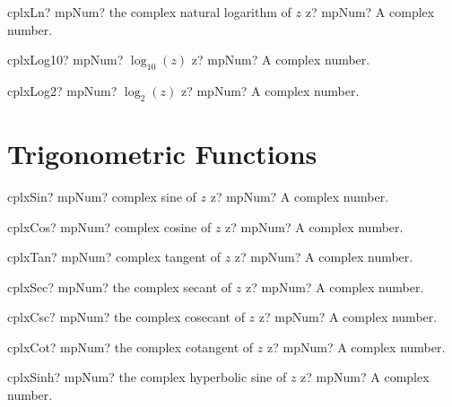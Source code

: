 \documentclass[12pt,a4paper,openany]{book}
\begin{document}
\begin{mpFunctionsExtract}
\mpFunctionOne
{cplxLn? mpNum? the complex natural logarithm of $z$}
{z? mpNum? A complex number.}
\end{mpFunctionsExtract}

\begin{mpFunctionsExtract}
\mpFunctionOne
{cplxLog10? mpNum? $\log_{10}(z)$}
{z? mpNum? A complex number.}
\end{mpFunctionsExtract}

\begin{mpFunctionsExtract}
\mpFunctionOne
{cplxLog2? mpNum? $\log_{2}(z)$}
{z? mpNum? A complex number.}
\end{mpFunctionsExtract}

\section{Trigonometric Functions}

\begin{mpFunctionsExtract}
\mpFunctionOne
{cplxSin? mpNum? complex sine of $z$}
{z? mpNum? A complex number.}
\end{mpFunctionsExtract}

\begin{mpFunctionsExtract}
\mpFunctionOne
{cplxCos? mpNum? complex cosine of $z$}
{z? mpNum? A complex number.}
\end{mpFunctionsExtract}

\begin{mpFunctionsExtract}
\mpFunctionOne
{cplxTan? mpNum? complex tangent of $z$}
{z? mpNum? A complex number.}
\end{mpFunctionsExtract}

\begin{mpFunctionsExtract}
\mpFunctionOne
{cplxSec? mpNum? the complex secant of $z$}
{z? mpNum? A complex number.}
\end{mpFunctionsExtract}

\begin{mpFunctionsExtract}
\mpFunctionOne
{cplxCsc? mpNum? the complex cosecant of $z$}
{z? mpNum? A complex number.}
\end{mpFunctionsExtract}

\begin{mpFunctionsExtract}
\mpFunctionOne
{cplxCot? mpNum? the complex cotangent of $z$}
{z? mpNum? A complex number.}
\end{mpFunctionsExtract}

\begin{mpFunctionsExtract}
\mpFunctionOne
{cplxSinh? mpNum? the complex hyperbolic sine of $z$}
{z? mpNum? A complex number.}
\end{mpFunctionsExtract}
\end{document}
